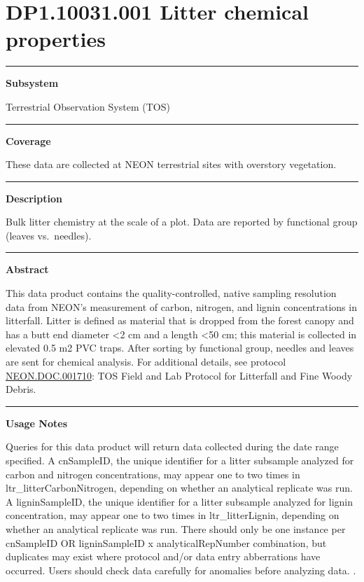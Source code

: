 \documentclass[]{article}
\begin{document}
\section{DP1.10031.001 Litter chemical
properties}\label{dp1.10031.001-litter-chemical-properties}

\begin{center}\rule{0.5\linewidth}{\linethickness}\end{center}

\textbf{Subsystem}

Terrestrial Observation System (TOS)

\begin{center}\rule{0.5\linewidth}{\linethickness}\end{center}

\textbf{Coverage}

These data are collected at NEON terrestrial sites with overstory
vegetation.

\begin{center}\rule{0.5\linewidth}{\linethickness}\end{center}

\textbf{Description}

Bulk litter chemistry at the scale of a plot. Data are reported by
functional group (leaves vs.~needles).

\begin{center}\rule{0.5\linewidth}{\linethickness}\end{center}

\textbf{Abstract}

This data product contains the quality-controlled, native sampling
resolution data from NEON's measurement of carbon, nitrogen, and lignin
concentrations in litterfall. Litter is defined as material that is
dropped from the forest canopy and has a butt end diameter \textless{}2
cm and a length \textless{}50 cm; this material is collected in elevated
0.5 m2 PVC traps. After sorting by functional group, needles and leaves
are sent for chemical analysis. For additional details, see protocol
\href{http://data.neonscience.org/api/v0/documents/NEON.DOC.001710vE}{NEON.DOC.001710}:
TOS Field and Lab Protocol for Litterfall and Fine Woody Debris.

\begin{center}\rule{0.5\linewidth}{\linethickness}\end{center}

\textbf{Usage Notes}

Queries for this data product will return data collected during the date
range specified. A cnSampleID, the unique identifier for a litter
subsample analyzed for carbon and nitrogen concentrations, may appear
one to two times in ltr\_litterCarbonNitrogen, depending on whether an
analytical replicate was run. A ligninSampleID, the unique identifier
for a litter subsample analyzed for lignin concentration, may appear one
to two times in ltr\_litterLignin, depending on whether an analytical
replicate was run. There should only be one instance per cnSampleID OR
ligninSampleID x analyticalRepNumber combination, but duplicates may
exist where protocol and/or data entry abberrations have occurred. Users
should check data carefully for anomalies before analyzing data.
\newpage
.
\end{document}
